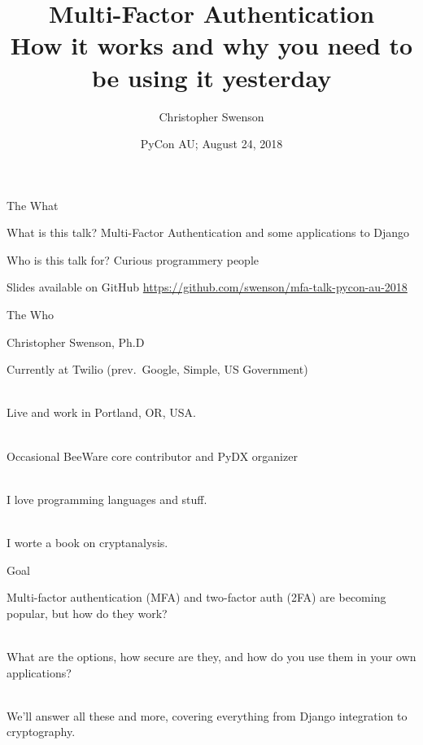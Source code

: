\documentclass{beamer}
\title[MFA]{Multi-Factor Authentication\\ How it works and why you need to be using it yesterday}
\author[@chris\_{}swenson]{Christopher Swenson}
\date[PyCon AU 2018]{PyCon AU; August 24, 2018}
\begin{document}
\begin{frame}
\titlepage
\end{frame}

\begin{frame}{The What}

\begin{block}{What is this talk?}
Multi-Factor Authentication and some applications to Django
\end{block}

\begin{block}{Who is this talk for?}
Curious programmery people
\end{block}

\begin{block}{Slides available on GitHub}
\url{https://github.com/swenson/mfa-talk-pycon-au-2018}
\end{block}

\end{frame}

\begin{frame}{The Who}

\begin{block}{Christopher Swenson, Ph.D}

Currently at Twilio (prev.\ Google, Simple, US Government)

\ \\

Live and work in Portland, OR, USA.

\ \\

Occasional BeeWare core contributor and PyDX organizer

\ \\

I love programming languages and stuff.

\ \\

I worte a book on cryptanalysis.

\end{block}

\end{frame}

\begin{frame}{Goal}

Multi-factor authentication (MFA) and two-factor auth (2FA) are becoming popular, but how do they work?

\ \\

What are the options, how secure are they, and how do you use them in your own applications?

\ \\

We'll answer all these and more, covering everything from Django integration to cryptography.

\end{frame}
\end{document}
